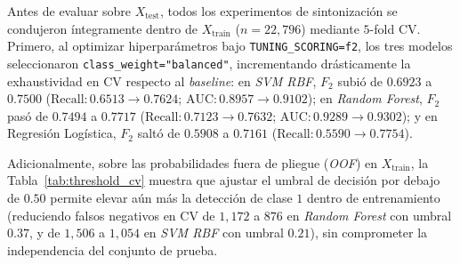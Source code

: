 \documentclass[conference]{IEEEtran}
\begin{document}
Antes de evaluar sobre $X_{\text{test}}$, todos los experimentos de sintonización se condujeron íntegramente dentro de $X_{\text{train}}$ ($n=22{,}796$) mediante $5$-fold CV. Primero, al optimizar hiperparámetros bajo \texttt{TUNING\_SCORING=f2}, los tres modelos seleccionaron \texttt{class\_weight="balanced"}, incrementando drásticamente la exhaustividad en CV respecto al \textit{baseline}: en \textit{SVM RBF}, $F_2$ subió de $0.6923$ a $0.7500$ ($\text{Recall}: 0.6513 \rightarrow 0.7624$; $\text{AUC}: 0.8957 \rightarrow 0.9102$); en \textit{Random Forest}, $F_2$ pasó de $0.7494$ a $0.7717$ ($\text{Recall}: 0.7123 \rightarrow 0.7632$; $\text{AUC}: 0.9289 \rightarrow 0.9302$); y en Regresión Logística, $F_2$ saltó de $0.5908$ a $0.7161$ ($\text{Recall}: 0.5590 \rightarrow 0.7754$).

Adicionalmente, sobre las probabilidades fuera de pliegue (\textit{OOF}) en $X_{\text{train}}$, la Tabla~\ref{tab:threshold_cv} muestra que ajustar el umbral de decisión por debajo de $0.50$ permite elevar aún más la detección de clase $1$ dentro de entrenamiento (reduciendo falsos negativos en CV de $1{,}172$ a $876$ en \textit{Random Forest} con umbral $0.37$, y de $1{,}506$ a $1{,}054$ en \textit{SVM RBF} con umbral $0.21$), sin comprometer la independencia del conjunto de prueba.

\begin{table}[t]
\centering
\scriptsize
\setlength{\tabcolsep}{3pt}
\caption{Optimización y Prueba de Umbral de Decisión bajo $F_2$-Score Exclusivamente en Validación Cruzada ($5$-fold CV en $X_{\text{train}}$)}
\label{tab:threshold_cv}
\end{table}
\end{document}
